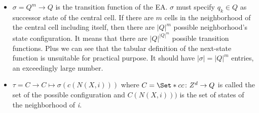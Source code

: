 \begin{itemize}
  \item \begin{math}\sigma=Q^m \rightarrow Q \end{math} is the transition
  function of the EA. \begin{math}\sigma\end{math} must specify
  \begin{math}q_k \in Q \end{math} as successor  state of the central cell.
  If there are \begin{math}m\end{math} cells in the neighborhood of the central
  cell including itself, then there are
  \begin{math}{\left\vert{Q}\right\vert}^m\end{math} possible neighborhood's
  state configuration. It  means that there are
  \begin{math}{\left\vert{Q}\right\vert}^{{\left\vert{Q}\right\vert}^m}\end{math}
  possible transition functions. Plus we can see that the tabular definition of
  the next-state function is unsuitable for practical purpose. It should have
  \begin{math}\left\vert{\sigma}\right\vert={\left\vert{Q}\right\vert}^m\end{math}
  entries, an exceedingly large number.
  \item \begin{math}\tau=C \longrightarrow C \longmapsto
  \sigma(c(N(X,i)))\end{math} where \begin{math}C=\Set*{c}{c \colon Z^d
  \rightarrow Q}\end{math} is called the set of the possible configuration and 
  \begin{math}
  C(N(X,i)))\end{math} is the set of states of the neighborhood of \textit{i}.
\end{itemize}




